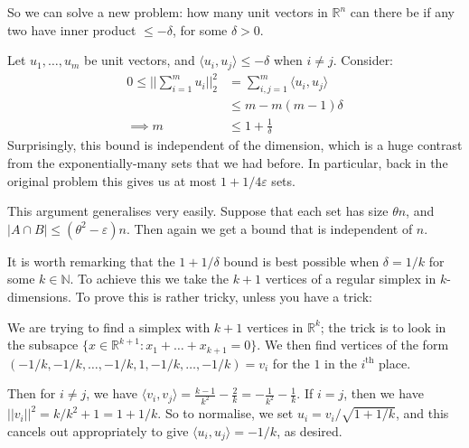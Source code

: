 \documentclass[]{article}
\theoremstyle{custhm}
\theoremstyle{cusdef}
\theoremstyle{custhm}
\theoremstyle{custhm}
\theoremstyle{custhm}
\theoremstyle{custhm}
\theoremstyle{cusdef}
\theoremstyle{remark}
\newcommand{\N}{\mathbb{N}}
\newcommand{\R}{\mathbb{R}}
\newcommand{\eps}{\varepsilon}
\begin{document}
So we can solve a new problem: how many unit vectors in $\R^n$ can there be if any two have inner product $\le -\delta$, for some $\delta > 0$.

Let $u_1,\dots,u_m$ be unit vectors, and $\langle u_i,u_j\rangle \le -\delta$ when $i\ne j$. Consider:
\begin{align*}
0\le ||\sum_{i=1}^{m}u_i||^2_2 &= \sum_{i,j=1}^{m}\langle u_i, u_j\rangle\\
&\le m - m(m-1)\delta\\
\implies m &\le 1 + \frac{1}{\delta}
\end{align*}
Surprisingly, this bound is independent of the dimension, which is a huge contrast from the exponentially-many sets that we had before. In particular, back in the original problem this gives us at most $1 + 1/4\eps$ sets.

This argument generalises very easily. Suppose that each set has size $\theta n$, and $|A \cap B|\le (\theta^2 - \eps)n$. Then again we get a bound that is independent of $n$.

It is worth remarking that the $1 + 1/\delta$ bound is best possible when $\delta = 1/k$ for some $k \in \N$. To achieve this we take the $k+1$ vertices of a regular simplex in $k$-dimensions. To prove this is rather tricky, unless you have a trick:

We are trying to find a simplex with $k+1$ vertices in $\R^k$; the trick is to look in the subsapce $\{x\in \R^{k+1}:x_1+\dots+x_{k+1} = 0\}$. We then find vertices of the form $(-1/k,-1/k,\dots,-1/k,1,-1/k,\dots,-1/k) = v_i$ for the $1$ in the $i^{\textrm{th}}$ place.

Then for $i\ne j$, we have $\langle v_i,v_j\rangle = \frac{k-1}{k^2} - \frac{2}{k} = -\frac{1}{k^2} - \frac{1}{k}$. If $i=j$, then we have $||v_i||^2 = k/k^2 + 1 = 1 + 1/k$. So to normalise, we set $u_i = v_i/\sqrt{1+1/k}$, and this cancels out appropriately to give $\langle u_i, u_j\rangle = - 1/k$, as desired.
\end{document}
